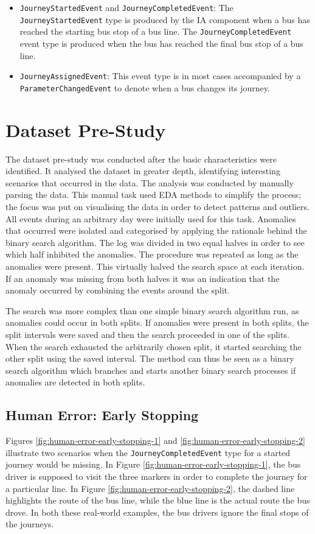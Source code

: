 \begin{itemize}
    \item \texttt{JourneyStartedEvent} and \texttt{JourneyCompletedEvent}: \newline
    The \texttt{JourneyStartedEvent} type is produced by the IA component when a bus has reached the starting bus stop of a bus line.
    The \texttt{JourneyCompletedEvent} event type is produced when the bus has reached the final bus stop of a bus line.

    \item \texttt{JourneyAssignedEvent}:
    This event type is in most cases accompanied by a \texttt{ParameterChangedEvent} to denote when a bus changes its journey.
\end{itemize}

\section{Dataset Pre-Study}
The dataset pre-study was conducted after the basic characteristics were identified.
It analysed the dataset in greater depth, identifying interesting scenarios that occurred in the data.
The analysis was conducted by manually parsing the data.
This manual task used EDA methods to simplify the process; the focus was put on visualising the data in order to detect patterns and outliers.
All events during an arbitrary day were initially used for this task.
Anomalies that occurred were isolated and categorised by applying the rationale behind the binary search algorithm.
The log was divided in two equal halves in order to see which half inhibited the anomalies.
The procedure was repeated as long as the anomalies were present.
This virtually halved the search space at each iteration.
If an anomaly was missing from both halves it was an indication that the anomaly occurred by combining the events around the split.

The search was more complex than one simple binary search algorithm run, as anomalies could occur in both splits.
If anomalies were present in both splits, the split intervals were saved and then the search proceeded in one of the splits.
When the search exhausted the arbitrarily chosen split, it started searching the other split using the saved interval.
The method can thus be seen as a binary search algorithm which branches and starts another binary search processes if anomalies are detected in both splits. 

\subsection{Human Error: Early Stopping}
Figures \ref{fig:human-error-early-stopping-1} and \ref{fig:human-error-early-stopping-2} illustrate two scenarios when the \texttt{JourneyCompletedEvent} type for a started journey would be missing.
In Figure \ref{fig:human-error-early-stopping-1}, the bus driver is supposed to visit the three markers in order to complete the journey for a particular line.
In Figure \ref{fig:human-error-early-stopping-2}, the dashed line highlights the route of the bus line, while the blue line is the actual route the bus drove.
In both these real-world examples, the bus drivers ignore the final stops of the journeys.


